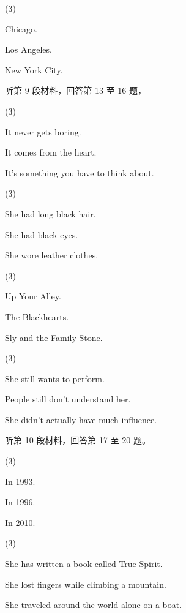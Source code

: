 \documentclass{英语试卷}
\begin{document}
\begin{choices}(3)
  \item Chicago.
  \item Los Angeles.
  \item New York City.
\end{choices}
\par 听第 9 段材料，回答第 13 至 16 题，\par
{}
\begin{choices}(3)
  \item It never gets boring.
  \item It comes from the heart.
  \item It's something you have to think about.
\end{choices}
\begin{choices}(3)
  \item She had long black hair.
  \item She had black eyes.
  \item She wore leather clothes.
\end{choices}
\begin{choices}(3)
  \item Up Your Alley.
  \item The Blackhearts.
  \item Sly and the Family Stone.
\end{choices}
\begin{choices}(3)
  \item She still wants to perform.
  \item People still don't understand her.
  \item She didn't actually have much influence.
\end{choices}
\par 听第 10 段材料，回答第 17 至 20 题。\par
{}
\begin{choices}(3)
  \item In 1993.
  \item In 1996.
  \item In 2010.
\end{choices}
\begin{choices}(3)
  \item She has written a book called True Spirit.
  \item She lost fingers while climbing a mountain.
  \item She traveled around the world alone on a boat.
\end{choices}
\end{document}
